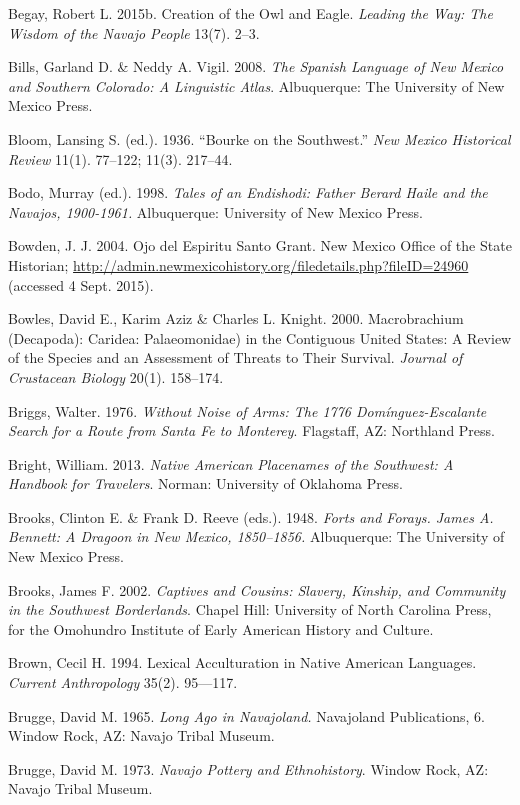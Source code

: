 Begay, Robert L. 2015b.  Creation of the Owl and Eagle.  \textit{Leading the Way: The Wisdom of the Navajo People} 13(7). 2--3.

Bills, Garland D. \& Neddy A. Vigil. 2008.  \textit{The Spanish Language of New Mexico and Southern Colorado: A Linguistic Atlas}.  Albuquerque:  The University of New Mexico Press.

Bloom, Lansing S. (ed.).  1936.  “Bourke on the Southwest.”  \textit{New Mexico Historical Review} 11(1). 77--122; 11(3). 217--44.

Bodo, Murray (ed.). 1998. \textit{ Tales of an Endishodi: Father Berard Haile and the Navajos, 1900{}-1961.}  Albuquerque:  University of New Mexico Press.

Bowden, J. J.  2004.  Ojo del Espiritu Santo Grant.  New Mexico Office of the State Historian; \url{http://admin.newmexicohistory.org/filedetails.php?fileID=24960} (accessed 4 Sept. 2015).

Bowles, David E., Karim Aziz \& Charles L. Knight. 2000.  Macrobrachium (Decapoda): Caridea: Palaeomonidae) in the Contiguous United States: A Review of the Species and an Assessment of Threats to Their Survival.  \textit{Journal of Crustacean Biology} 20(1). 158--174.

Briggs, Walter. 1976.  \textit{Without Noise of Arms: The 1776 Domínguez-Escalante Search for a Route from Santa Fe to Monterey}.  Flagstaff, AZ:  Northland Press.

Bright, William. 2013.  \textit{Native American Placenames of the Southwest: A Handbook for Travelers}.  Norman:  University of Oklahoma Press.

Brooks, Clinton E. \& Frank D. Reeve (eds.). 1948.  \textit{Forts and Forays. James A. Bennett: A Dragoon in New Mexico, 1850--1856.}  Albuquerque:  The University of New Mexico Press.

Brooks, James F.  2002.  \textit{Captives and Cousins: Slavery, Kinship, and Community in the Southwest Borderlands}.  Chapel Hill:  University of North Carolina Press, for the Omohundro Institute of Early American History and Culture.

Brown, Cecil H.  1994.  Lexical Acculturation in Native American Languages.  \textit{Current Anthropology} 35(2). 95---117.

Brugge, David M.  1965.  \textit{Long Ago in Navajoland.}  Navajoland Publications, 6.  Window Rock, AZ: Navajo Tribal Museum.

Brugge, David M. 1973. \textit{Navajo Pottery and Ethnohistory}.  Window Rock, AZ:  Navajo Tribal Museum.

